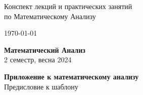 \documentclass[10pt,a4paper]{report}
\begin{document}
	\vspace*{\fill}
	\begin{center}
		\fontsize{27pt}{9pt}\selectfont
		Конспект лекций и практических занятий \\
		по Математическому Анализу
	\end{center}
	\vspace*{\fill}
	\hfill{}\today
	\newpage
	
	\begin{center}
		\textbf{\LARGE{}Математический Анализ} \\ \large 2 семестр, весна 2024
	\end{center}
	
	
	

	
	
	\newpage
	\begin{center}
		\textbf{\LARGE{}Приложение к математическому анализу} \\ \large {\color{red}Предисловие к шаблону}
	\end{center}
	
	\hypersetup{linkcolor=blue}
	
	
	\newpage
	
	
	
	
	
\end{document}
